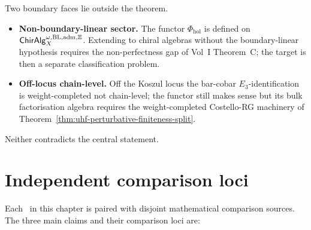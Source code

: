 \begin{remark}
\label{rem:uhf-open}
Two boundary faces lie outside the theorem.
\begin{itemize}[leftmargin=1.3em]
\item \textbf{Non-boundary-linear sector.} The functor
 $\Phi_{\mathrm{hol}}$ is defined on
 $\mathsf{ChirAlg}^{\omega,\mathrm{BL,adm},\Xi}_X$.
 Extending to chiral algebras without the boundary-linear
 hypothesis requires the non-perfectness gap of Vol~I
 Theorem~C; the target is then a separate classification problem.
\item \textbf{Off-locus chain-level.} Off the Koszul locus the
 bar-cobar $E_3$-identification is weight-completed not
 chain-level; the functor still makes sense but its bulk
 factorisation algebra requires the weight-completed Costello-RG
 machinery of Theorem~\ref{thm:uhf-perturbative-finiteness-split}.
\end{itemize}
Neither contradicts the central statement.
\end{remark}

\section{Independent comparison loci}
\label{sec:uhf-independent-verification}

Each \ClaimStatusProvedHere\ in this chapter is paired with disjoint
mathematical comparison sources. The three main claims and their
comparison loci are:

